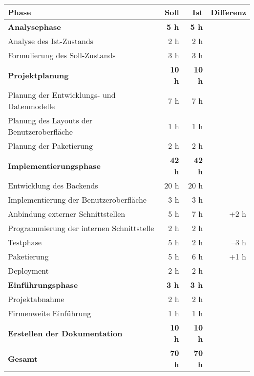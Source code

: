 \begin{tabularx}{\textwidth}{Xrrr}
\rowcolor{odd}\textbf{Phase} & \textbf{Soll} & \textbf{Ist} & \textbf{Differenz} \\
\hline
\hline
\rowcolor{heading}\textbf{Analysephase} & \textbf{5 h} & \textbf{5 h} & \textbf{} \\
Analyse des Ist-Zustands & 2 h      & 2 h   &  \\
\rowcolor{odd}Formulierung des Soll-Zustands & 3 h      & 3 h   &  \\
\rowcolor{heading}\textbf{Projektplanung} & \textbf{10 h} & \textbf{10 h} & \textbf{} \\
Planung der Entwicklungs- und Datenmodelle & 7 h      & 7 h   &  \\
\rowcolor{odd}Planung des Layouts der Benutzeroberfläche & 1 h      & 1 h   &  \\
Planung der Paketierung & 2 h      & 2 h   &  \\
\rowcolor{heading}\textbf{Implementierungsphase} & \textbf{42 h} & \textbf{42 h} & \textbf{} \\
Entwicklung des Backends & 20 h      & 20 h   &  \\
\rowcolor{odd} Implementierung der Benutzeroberfläche & 3 h      & 3 h   &  \\
Anbindung externer Schnittstellen & 5 h      & 7 h  & +2 h \\
\rowcolor{odd}Programmierung der internen Schnittstelle & 2 h      & 2 h   &  \\
Testphase & 5 h      & 2 h   &  –3 h\\
\rowcolor{odd}Paketierung & 5 h     & 6 h   & +1 h \\
Deployment & 2 h      & 2 h   &  \\
\rowcolor{heading}\textbf{Einführungsphase} & \textbf{3 h} & \textbf{3 h} & \textbf{} \\
Projektabnahme & 2 h      & 2 h   &  \\
\rowcolor{odd}Firmenweite Einführung & 1 h    & 1 h   &  \\
\rowcolor{heading}\textbf{Erstellen der Dokumentation} & \textbf{10 h} & \textbf{10 h} & \textbf{} \\
\hline
\hline
\rowcolor{odd}\textbf{Gesamt} & \textbf{70 h} & \textbf{70 h} & \textbf{} \\
\end{tabularx}
